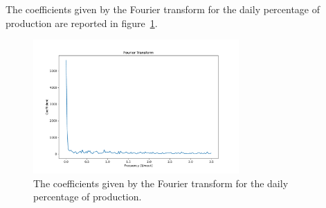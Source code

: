 The coefficients given by the Fourier transform for the daily percentage of production are reported in figure~\ref{fig:productionftday}. %

\begin{figure}[H]
\centering
\includegraphics[width=0.7\textwidth]{images/production/ft_day}
\caption{The coefficients given by the Fourier transform for the daily percentage of production.}
\label{fig:productionftday}
\end{figure}

